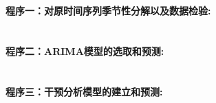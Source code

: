 \documentclass[12pt,a4paper]{nmmcm}
\begin{document}
\begin{appendices}

\section*{}

\textbf{\textcolor[rgb]{0.98,0.00,0.00}{程序一：对原时间序列季节性分解以及数据检验:}}


\section*{}

\textcolor[rgb]{0.98,0.00,0.00}{\textbf{程序二：ARIMA模型的选取和预测:}}


\section*{}

\textcolor[rgb]{0.98,0.00,0.00}{\textbf{程序三：干预分析模型的建立和预测:}}


\section*{}

\end{appendices}
\end{document}
